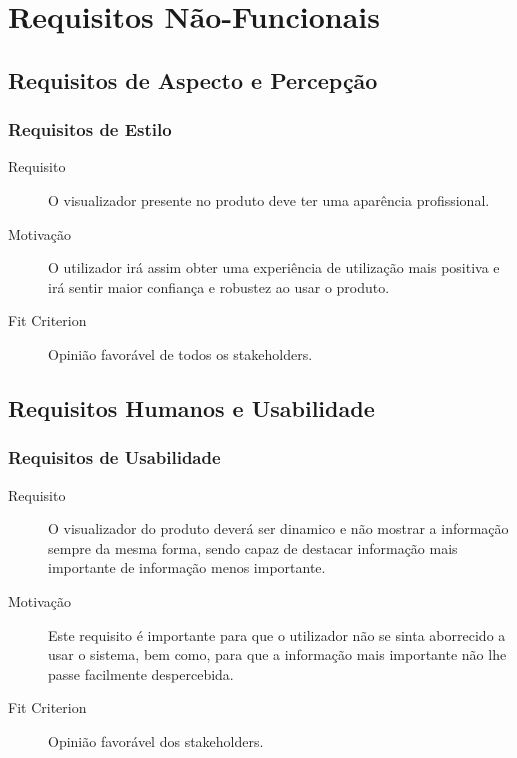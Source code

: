 \chapter{Requisitos Não-Funcionais}
\minitoc

\section{Requisitos de Aspecto e Percepção}


\subsection{Requisitos de Estilo}
\begin{description}
\item[Requisito] O visualizador presente no produto deve ter uma aparência profissional.
\item[Motivação] O utilizador irá assim obter uma experiência de utilização mais positiva e irá sentir maior confiança e robustez
ao usar o produto.
\item[Fit Criterion] Opinião favorável de todos os stakeholders.
\end{description}






\section{Requisitos Humanos e Usabilidade}
\subsection{Requisitos de Usabilidade}
\begin{description}
\item[Requisito] O visualizador do produto deverá ser dinamico e não mostrar a informação sempre da mesma forma, sendo capaz de destacar informação mais importante de informação menos importante.
\item[Motivação] Este requisito é importante para que o utilizador não se sinta aborrecido a usar o sistema, bem como, 
para que a informação mais importante não lhe passe facilmente despercebida.  
\item[Fit Criterion] Opinião favorável dos stakeholders.
\end{description}


